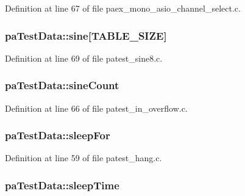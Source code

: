 Definition at line 67 of file paex\+\_\+mono\+\_\+asio\+\_\+channel\+\_\+select.\+c.

\subsubsection[{\texorpdfstring{sine}{sine}}]{ pa\+Test\+Data\+::sine\mbox{[}{\bf T\+A\+B\+L\+E\+\_\+\+S\+I\+ZE}\mbox{]}}\hypertarget{structpa_test_data_a89b2ad9469d771a4bf45ee8954ccdf2b}{}\label{structpa_test_data_a89b2ad9469d771a4bf45ee8954ccdf2b}


Definition at line 69 of file patest\+\_\+sine8.\+c.

\subsubsection[{\texorpdfstring{sine\+Count}{sineCount}}]{ pa\+Test\+Data\+::sine\+Count}\hypertarget{structpa_test_data_aba7c266ca0ba4e2049281ec3f96f8ab1}{}\label{structpa_test_data_aba7c266ca0ba4e2049281ec3f96f8ab1}


Definition at line 66 of file patest\+\_\+in\+\_\+overflow.\+c.

\subsubsection[{\texorpdfstring{sleep\+For}{sleepFor}}]{ pa\+Test\+Data\+::sleep\+For}\hypertarget{structpa_test_data_aaa5260c006423a82441e3e979ff93959}{}\label{structpa_test_data_aaa5260c006423a82441e3e979ff93959}


Definition at line 59 of file patest\+\_\+hang.\+c.

\subsubsection[{\texorpdfstring{sleep\+Time}{sleepTime}}]{ pa\+Test\+Data\+::sleep\+Time}\hypertarget{structpa_test_data_ac6f0c560200b0e1072a2da8c4e98f9f1}{}\label{structpa_test_data_ac6f0c560200b0e1072a2da8c4e98f9f1}


